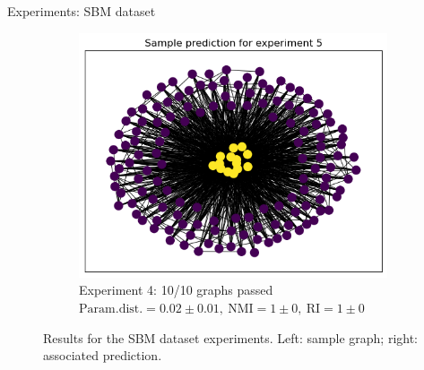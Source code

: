 \documentclass[final]{beamer}
\newlength{\colwidth}
\begin{document}
\begin{frame}[t]
\begin{columns}[t]
\begin{column}{\colwidth}
\begin{block}{Experiments: SBM dataset}
\begin{figure}[h]
\begin{subfigure}{0.49\linewidth}
            \includegraphics[width=0.49\linewidth, trim={5 5 5 18}, clip]{figures/exp5_pred.png}
            \caption{\centering Experiment 4: 10/10 graphs passed\\ $\mathrm{Param. dist.} = 0.02 \pm 0.01, \ \mathrm{NMI} = 1 \pm 0, \ \mathrm{RI} = 1 \pm 0$}
            \label{fig:exp4}
          \end{subfigure}
          \caption{Results for the SBM dataset experiments. Left: sample graph; right: associated prediction.}
          \label{fig:sbm_exp}
        \end{figure}
      \end{block}


\end{column}
\end{columns}
\end{frame}
\end{document}
